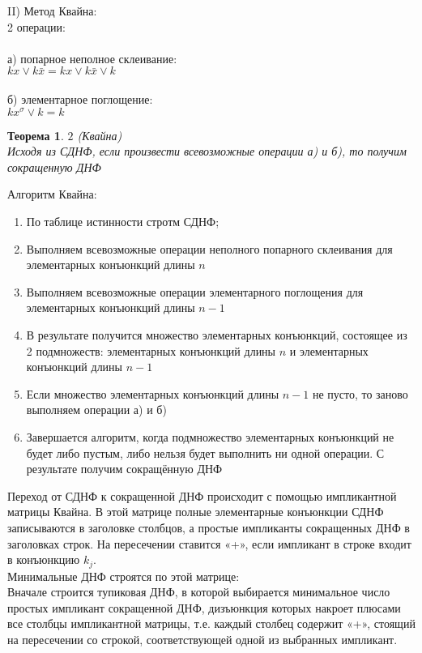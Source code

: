 \documentclass[a4paper, 12pt]{report}
\newtheorem*{theorem}{Теорема} %
\begin{document}
II) \quad Метод Квайна:\\
2 операции:\\\\
а) попарное неполное склеивание:\\
$kx \vee k \bar x = kx \vee k \bar x \vee k$\\\\
б) элементарное поглощение:\\
$kx^{\sigma} \vee k = k$\\
\begin{theorem} $2$ (Квайна)\\
	Исходя из СДНФ, если произвести всевозможные операции а) и б), то получим сокращенную ДНФ   
\end{theorem}
Алгоритм Квайна:
\begin{enumerate}
	\item По таблице истинности стротм СДНФ;
	\item Выполняем всевозможные операции неполного попарного склеивания для элементарных конъюнкций длины $n$
	\item Выполняем всевозможные операции элементарного поглощения для элементарных конъюнкций длины $n-1$
	\item В результате получится множество элементарных конъюнкций, состоящее из 2 подмножеств: элементарных конъюнкций длины $n$ и элементарных конъюнкций длины $n-1$
	\item Если множество элементарных конъюнкций длины $n-1$ не пусто, то заново выполняем операции а) и б)
	\item Завершается алгоритм, когда подмножество элементарных конъюнкций не будет либо пустым, либо нельзя будет выполнить ни одной операции. С результате получим сокращённую ДНФ
\end{enumerate}
Переход от СДНФ к сокращенной ДНФ происходит с помощью импликантной матрицы Квайна. В этой матрице полные элементарные конъюнкции СДНФ записываются в заголовке столбцов, а простые импликанты сокращенных ДНФ в заголовках строк. На пересечении ставится «+», если импликант в строке входит в конъюнкцию $k_j$.\\
Минимальные ДНФ строятся по этой матрице:\\
Вначале строится тупиковая ДНФ, в которой выбирается минимальное число простых импликант сокращенной ДНФ, дизъюнкция которых накроет плюсами все столбцы импликантной матрицы, т.е. каждый столбец содержит «+», стоящий на пересечении со строкой, соответствующей одной из выбранных импликант.\\
\end{document}
